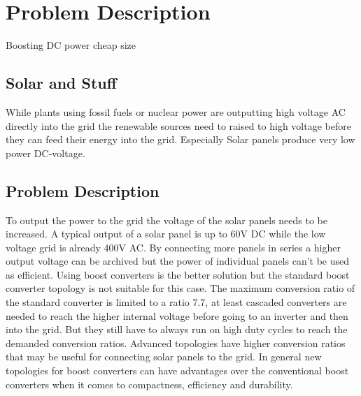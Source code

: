 \chapter{Problem Description}\label{ch:probdesc}
Boosting DC power
cheap
size

\section{Solar and Stuff}
While plants using fossil fuels or nuclear power are outputting high voltage AC directly into the grid the renewable sources need to raised to high voltage before they can feed their energy into the grid.
Especially Solar panels produce very low power DC-voltage. 

\section{Problem Description}
To output the power to the grid the voltage of the solar panels needs to be increased. 
A typical output of a solar panel is up to 60V DC while the low voltage grid is already 400V AC.
By connecting more panels in series a higher output voltage can be archived but the power of individual panels can't be used as efficient.
Using boost converters is the better solution but the standard boost converter topology is not suitable for this case. 
The maximum conversion ratio of the standard converter is limited to a ratio 7.7, at least cascaded converters are needed to reach the higher internal voltage before going to an inverter and then into the grid.
But they still have to always run on high duty cycles to reach the demanded conversion ratios.
Advanced topologies have higher conversion ratios that may be useful for connecting solar panels to the grid.
In general new topologies for boost converters can have advantages over the conventional boost converters when it comes to compactness, efficiency and durability.